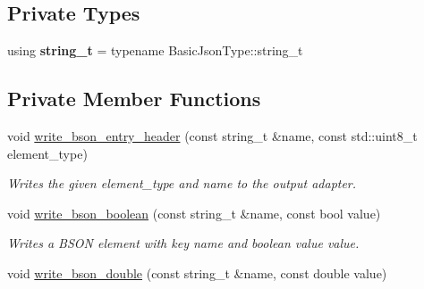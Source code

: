 \subsection*{Private Types}
\begin{DoxyCompactItemize}
\item 
\mbox{\label{classnlohmann_1_1detail_1_1binary__writer_a29f2ae7a5c4a8c1dae47b3b2310de8a8}} 
using {\bfseries string\+\_\+t} = typename Basic\+Json\+Type\+::string\+\_\+t
\end{DoxyCompactItemize}
\subsection*{Private Member Functions}
\begin{DoxyCompactItemize}
\item 
\mbox{\label{classnlohmann_1_1detail_1_1binary__writer_a1b5b7f5c03b1f8b1f59ea61db9634108}} 
void \mbox{\hyperlink{classnlohmann_1_1detail_1_1binary__writer_a1b5b7f5c03b1f8b1f59ea61db9634108}{write\+\_\+bson\+\_\+entry\+\_\+header}} (const string\+\_\+t \&name, const std\+::uint8\+\_\+t element\+\_\+type)
\begin{DoxyCompactList}\small\item\em Writes the given {\itshape element\+\_\+type} and {\itshape name} to the output adapter. \end{DoxyCompactList}\item 
\mbox{\label{classnlohmann_1_1detail_1_1binary__writer_ae099435e1df3096e0fc78333282f8f67}} 
void \mbox{\hyperlink{classnlohmann_1_1detail_1_1binary__writer_ae099435e1df3096e0fc78333282f8f67}{write\+\_\+bson\+\_\+boolean}} (const string\+\_\+t \&name, const bool value)
\begin{DoxyCompactList}\small\item\em Writes a B\+S\+ON element with key {\itshape name} and boolean value {\itshape value}. \end{DoxyCompactList}\item 
\mbox{\label{classnlohmann_1_1detail_1_1binary__writer_a263ec18815467bb9919021ef126919ca}} 
void \mbox{\hyperlink{classnlohmann_1_1detail_1_1binary__writer_a263ec18815467bb9919021ef126919ca}{write\+\_\+bson\+\_\+double}} (const string\+\_\+t \&name, const double value)

\end{DoxyCompactItemize}
